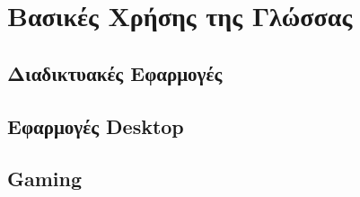 \section{Βασικές Χρήσης της Γλώσσας}

\subsection{Διαδικτυακές Εφαρμογές}
\label{webapps}


\subsection*{Εφαρμογές Desktop}
\label{desktopapps}


\subsection*{Gaming}
\label{Gaming}
